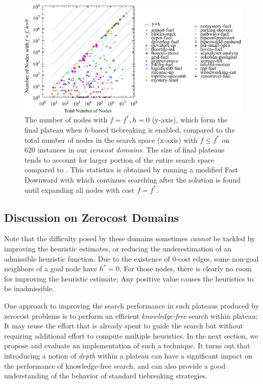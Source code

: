 \begin{figure}[htbp]
  \centering
  \includegraphics{tables/aaai16-frontier/zerocost/lmcut_frontier-front.pdf}
  \caption{
 The number of nodes with $f=f^*, h=0$ (y-axis), which form
  the final plateau when $h$-based tiebreaking is enabled, compared to
 the total number of nodes in the search space (x-axis) with
 $f\leq f^*$ on 620 instances in our \emph{zerocost domains}.
 The size of final plateaus tends to account for larger portion of the
 entire search space compared to .
 This statistics is obtained by running a modified Fast Downward with
 \lmcut which continues searching after the solution is found
 until expanding all nodes with cost $f=f^*$.
 }
 \label{fig:plateau-zerocost}
\end{figure}

\subsection{Discussion on Zerocost Domains}

Note that the difficulty posed by these domains sometimes \emph{cannot}
be tackled by improving the heuristic estimates, or reducing the
underestimation of an admissible heuristic function.  Due to the
existence of 0-cost edges, some non-goal neighbors of a goal node 
have $h^*=0$. For those nodes,
there is clearly no room for improving the heuristic estimate; Any positive
value causes the heuristics to be inadmissible.

One approach to improving the search performance in such plateaus
produced by zerocost problems is to perform an efficient
\emph{knowledge-free} search within plateau; It may reuse the effort
that is already spent to guide the search but without requiring 
additional effort to compute multiple heuristics.
In the next section, we propose and evaluate an implementation of
such a technique. It turns out that introducing a notion of \emph{depth} within a plateau can have
a significant impact on the performance of knowledge-free search, and can also 
provide a good  understanding of the behavior of standard tiebreaking strategies.

